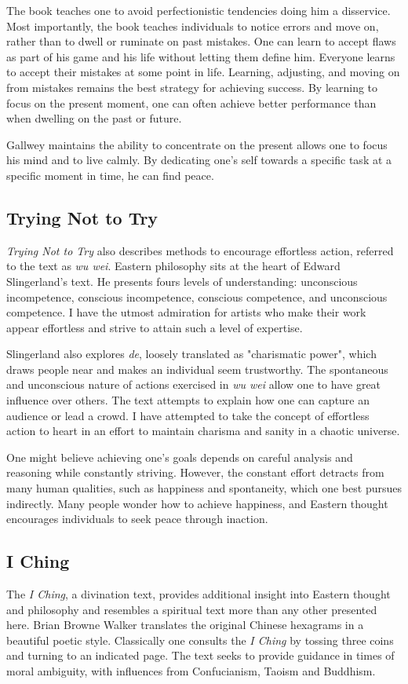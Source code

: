 \documentclass{article}
\begin{document}
The book teaches one to avoid perfectionistic tendencies doing him a disservice. Most importantly, the book teaches individuals to notice errors and move on, rather than to dwell or ruminate on past mistakes. One can learn to accept flaws as part of his game and his life without letting them define him. Everyone learns to accept their mistakes at some point in life. Learning, adjusting, and moving on from mistakes remains the best strategy for achieving success. By learning to focus on the present moment, one can often achieve better performance than when dwelling on the past or future. 

Gallwey maintains the ability to concentrate on the present allows one to focus his mind and to live calmly. By dedicating one's self towards a specific task at a specific moment in time, he can find peace. 

\subsection{Trying Not to Try}
\textit{Trying Not to Try} also describes methods to encourage effortless action, referred to the text as \emph{wu wei}. Eastern philosophy sits at the heart of Edward Slingerland's text. He presents fours levels of understanding: unconscious incompetence, conscious incompetence, conscious competence, and unconscious competence. I have the utmost admiration for artists who make their work appear effortless and strive to attain such a level of expertise. 

Slingerland also explores \emph{de}, loosely translated as "charismatic power", which draws people near and makes an individual seem trustworthy. The spontaneous and unconscious nature of actions exercised in  \emph{wu wei} allow one to have great influence over others. The text attempts to explain how one can capture an audience or lead a crowd. I have attempted to take the concept of effortless action to heart in an effort to maintain charisma and sanity in a chaotic universe. 

One might believe achieving one's goals depends on careful analysis and reasoning while constantly striving. However, the constant effort detracts from many human qualities, such as happiness and spontaneity, which one best pursues indirectly. Many people wonder how to achieve happiness, and Eastern thought encourages individuals to seek peace through inaction. 
\subsection{I Ching}
The \textit{I Ching}, a divination text, provides additional insight into Eastern thought and philosophy and  resembles a spiritual text more than any other presented here. Brian Browne Walker translates the original Chinese hexagrams in a beautiful poetic style. Classically one consults the \textit{I Ching} by tossing three coins and turning to an indicated page. The text seeks to provide guidance in times of moral ambiguity, with influences from Confucianism, Taoism and Buddhism. 
\end{document}
